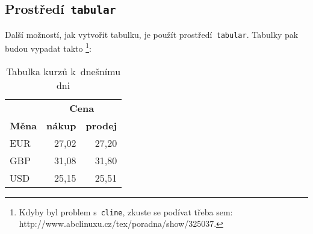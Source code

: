 \documentclass[a4paper,11pt]{article}
\begin{document}
\subsection{Prostředí\texttt{ tabular}}
Další možností, jak vytvořit tabulku, je použít prostředí\texttt{ tabular}. Tabulky pak budou vypadat takto \footnote{Kdyby byl problem s~\texttt{cline}, zkuste se podívat třeba sem: http://www.abclinuxu.cz/tex/poradna/show/325037.}:
\bigskip
\begin{table}[h]
\centering 
\begin{tabular}{|l|r|r|} \hline & \multicolumn{2}{c|}{\bfseries Cena} \\ \cline{2-3}
\bfseries Měna &\bfseries nákup &\bfseries prodej \\ \hline
EUR & 27,02 & 27,20 \\
GBP & 31,08 & 31,80 \\
USD & 25,15 & 25,51	\\ \hline
\end{tabular}
\caption{Tabulka kurzů k~dnešnímu dni}
\label{tabulka1}
\end{table}
\bigskip
\end{document}
